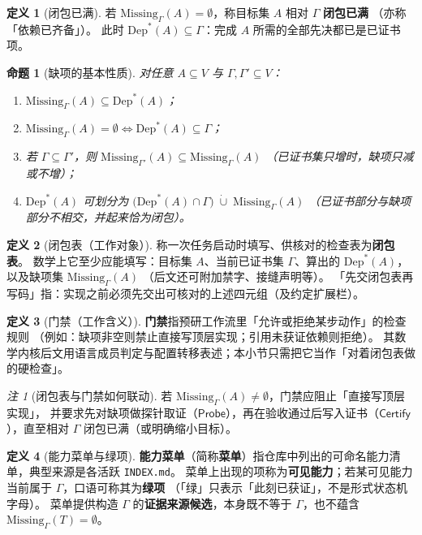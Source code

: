 \documentclass[UTF8,a4paper,11pt]{ctexart}
\theoremstyle{definition}
\newtheorem{definition}{定义}[section]
\theoremstyle{plain}
\newtheorem{proposition}{命题}[section]
\theoremstyle{remark}
\newtheorem{remark}{注}[section]
\numberwithin{figure}{section}
\numberwithin{table}{section}
\begin{document}
\begin{definition}[闭包已满]
若 $\mathrm{Missing}_\Gamma(A)=\emptyset$，称目标集 $A$ 相对 $\Gamma$ \textbf{闭包已满}
（亦称「依赖已齐备」）。
此时 $\mathrm{Dep}^*(A)\subseteq\Gamma$：完成 $A$ 所需的全部先决都已是已证书项。
\end{definition}

\begin{proposition}[缺项的基本性质]
对任意 $A\subseteq V$ 与 $\Gamma,\Gamma'\subseteq V$：
\begin{enumerate}
  \item $\mathrm{Missing}_\Gamma(A)\subseteq\mathrm{Dep}^*(A)$；
  \item $\mathrm{Missing}_\Gamma(A)=\emptyset \iff \mathrm{Dep}^*(A)\subseteq\Gamma$；
  \item 若 $\Gamma\subseteq\Gamma'$，则 $\mathrm{Missing}_{\Gamma'}(A)\subseteq\mathrm{Missing}_\Gamma(A)$
        （已证书集只增时，缺项只减或不增）；
  \item $\mathrm{Dep}^*(A)$ 可划分为
        $\bigl(\mathrm{Dep}^*(A)\cap\Gamma\bigr)\;\dot{\cup}\;\mathrm{Missing}_\Gamma(A)$
        （已证书部分与缺项部分不相交，并起来恰为闭包）。
\end{enumerate}
\end{proposition}

\begin{definition}[闭包表（工作对象）]
称一次任务启动时填写、供核对的检查表为\textbf{闭包表}。
数学上它至少应能填写：目标集 $A$、当前已证书集 $\Gamma$、算出的 $\mathrm{Dep}^*(A)$，以及缺项集 $\mathrm{Missing}_\Gamma(A)$
（后文还可附加禁字、接缝声明等）。
「先交闭包表再写码」指：实现之前必须先交出可核对的上述四元组（及约定扩展栏）。
\end{definition}

\begin{definition}[门禁（工作含义）]
\textbf{门禁}指预研工作流里「允许或拒绝某步动作」的检查规则
（例如：缺项非空则禁止直接写顶层实现；引用未获证依赖则拒绝）。
其数学内核后文用语言成员判定与配置转移表述；本小节只需把它当作「对着闭包表做的硬检查」。
\end{definition}

\begin{remark}[闭包表与门禁如何联动]
若 $\mathrm{Missing}_\Gamma(A)\neq\emptyset$，门禁应阻止「直接写顶层实现」，
并要求先对缺项做探针取证（$\mathsf{Probe}$），再在验收通过后写入证书（$\mathsf{Certify}$），直至相对 $\Gamma$ 闭包已满（或明确缩小目标）。
\end{remark}

\begin{definition}[能力菜单与绿项]
\textbf{能力菜单}（简称\textbf{菜单}）指仓库中列出的可命名能力清单，典型来源是各活跃 \texttt{INDEX.md}。
菜单上出现的项称为\textbf{可见能力}；若某可见能力当前属于 $\Gamma$，口语可称其为\textbf{绿项}
（「绿」只表示「此刻已获证」，不是形式状态机字母）。
菜单提供构造 $\Gamma$ 的\textbf{证据来源候选}，本身既不等于 $\Gamma$，也不蕴含 $\mathrm{Missing}_\Gamma(T)=\emptyset$。
\end{definition}
\end{document}
